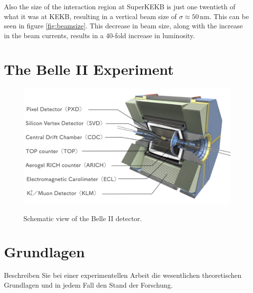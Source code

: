 \documentclass[a4paper,11pt,oneside,final,german,openbib,pdftex]{scrbook}
\begin{document}
Also the size of the interaction region at SuperKEKB is just one twentieth of what it was at KEKB, resulting in a vertical beam size of $\sigma \approx 50\,\textrm{nm} $. This can be seen in figure \ref{fig:beamsize}. This decrease in beam size, along with the increase in the beam currents, results in a 40-fold increase in luminosity. 






\section{The Belle II Experiment}
\label{sec:BelleII}

\begin{figure}[h!]
	\centering
	\includegraphics[width=14.5cm]{Bilder/Belle2}
	\label{fig:Belle2}
	\caption{Schematic view of the Belle II detector.}
\end{figure}



\section{Grundlagen}

Beschreiben Sie bei einer experimentellen Arbeit die wesentlichen 
theoretischen Grundlagen und in jedem Fall den Stand der Forschung.
\end{document}
